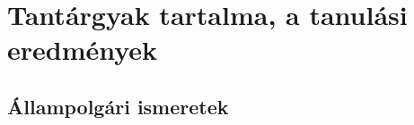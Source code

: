 \hypertarget{tantargyak-tartalma-a-tanulasi-eredmenyek}{%
\section{Tantárgyak tartalma, a tanulási
eredmények}\label{tantargyak-tartalma-a-tanulasi-eredmenyek}}

\hypertarget{allampolgari-ismeretek}{%
\subsection{Állampolgári ismeretek}\label{allampolgari-ismeretek}}

\newsavebox{\evfbox}
\newdimen{\evflength}
\settowidth{\evflength}{\usebox{\evfbox}}
\newdimen{\columnlength}
\setlength{\columnlength}{\textwidth}
\addtolength{\columnlength}{-\evflength}

